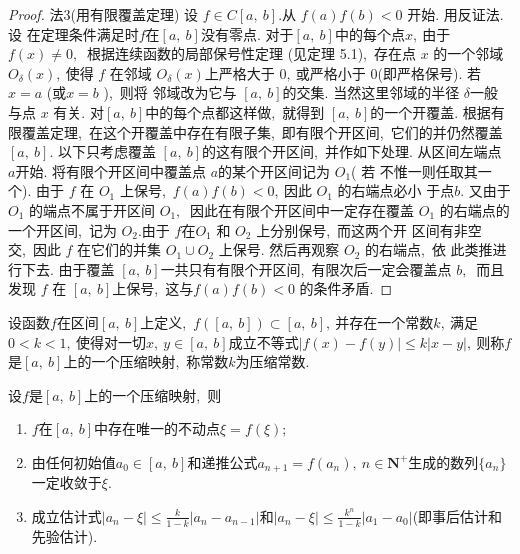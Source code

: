 \begin{proof}
	法3(用有限覆盖定理) 设  $f \in C[a,\  b] . $从 $ f(a) f(b)<0 $ 开始. 用反证法. 设 在定理条件满足时$  f  $在$  [a,\  b]  $没有零点. 对于$  [a,\  b]  $中的每个点$  x ,\  $由于 $ f(x) \neq 0 ,\ $ 根据连续函数的局部保号性定理 (见定理 5.1),\  存在点 $ x $ 的一个邻域  $O_{\delta}(x) ,\  $使得 $ f$  在邻域  $O_{\delta}(x)  $上严格大于 $0 ,\  $或严格小于 $0$(即严格保号). 若 $ x=a $ (或$  x=b$  ),\  则将 邻域改为它与 $ [a,\  b]  $的交集. 当然这里邻域的半径  $\delta  $一般与点 $ x $ 有关.
	对$  [a,\  b]  $中的每个点都这样做,\  就得到  $[a,\  b]  $的一个开覆盖. 根据有限覆盖定理,\  在这个开覆盖中存在有限子集,\  即有限个开区间,\  它们的并仍然覆盖$  [a,\  b] .$
	以下只考虑覆盖 $ [a,\  b]  $的这有限个开区间,\  并作如下处理.
	从区间左端点  $a  $开始. 将有限个开区间中覆盖点 $ a  $的某个开区间记为  $O_{1} $( 若 不惟一则任取其一个). 由于 $f$  在  $O_{1} $ 上保号,\  $ f(a) f(b)<0 ,\  $因此 $O_{1}$ 的右端点必小 于点$  b .$ 又由于  $O_{1} $ 的端点不属于开区间  $O_{1} ,\ $ 因此在有限个开区间中一定存在覆盖  $O_{1} $ 的右端点的一个开区间,\  记为  $O_{2} . $由于 $ f  $在$  O_{1} $ 和 $ O_{2} $ 上分别保号,\  而这两个开 区间有非空交,\  因此  $f$  在它们的并集 $ O_{1} \cup O_{2} $ 上保号. 然后再观察  $O_{2} $ 的右端点,\  依 此类推进行下去.
	由于覆盖 $ [a,\  b]  $一共只有有限个开区间,\  有限次后一定会覆盖点 $ b ,\ $ 而且发现  $f$  在  $[a,\  b]  $上保号,\  这与$  f(a) f(b)<0 $ 的条件矛盾.
\end{proof}
\newpage
\begin{definition}[压缩映射的定义]
	设函数$f$在区间$[a,\ b]$上定义,\ $f([a,\ b])\subset[a,\ b],\ $并存在一个常数$k,\ $满足$0<k<1,\ $使得对一切$x,\ y\in[a,\ b]$成立不等式$|f(x)-f(y)|\leqslant k|x-y|,\ $则称$f$是$[a,\ b]$上的一个压缩映射,\ 称常数$k$为压缩常数.
\end{definition}
\begin{proposition}[压缩映射原理]
	设$f$是$[a,\ b]$上的一个压缩映射,\ 则
	\begin{enumerate}
		\item $f$在$[a,\ b]$中存在唯一的不动点$\xi=f(\xi);$
		\item 由任何初始值$a_0\in[a,\ b]$和递推公式$a_{n+1}=f(a_n),\ n\in\mathbf{N}^+$生成的数列$\{a_n\}$一定收敛于$\xi.$
		\item 成立估计式$|a_n-\xi|\leqslant\frac{k}{1-k}|a_n-a_{n-1}|$和$|a_n-\xi|\leqslant\frac{k^n}{1-k}|a_1-a_0|$(即事后估计和先验估计).
	\end{enumerate}
\end{proposition}
